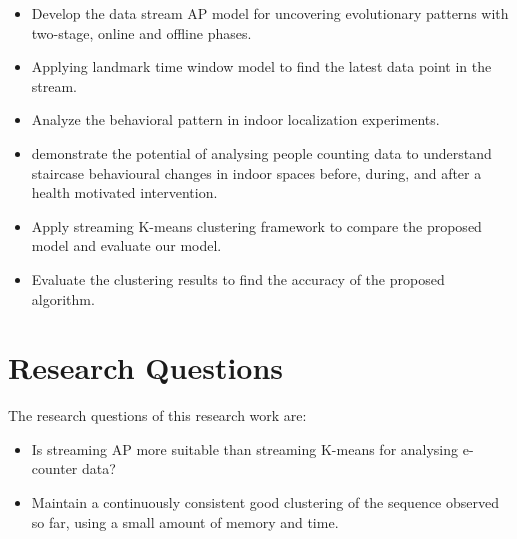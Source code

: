 \documentclass[../UNBThesis2.tex]{subfiles}
\begin{document}
\begin{itemize}
    \item Develop the data stream AP model for uncovering evolutionary patterns with two-stage, online and offline phases.
     \item Applying landmark time window model to find the latest data point in the stream.
   
    \item Analyze the behavioral pattern in indoor localization experiments.
    \item demonstrate the potential of analysing people counting data to understand staircase behavioural changes in indoor spaces before, during, and after a health motivated intervention.
    \item Apply streaming K-means clustering framework to compare the proposed model and evaluate our model.
    \item Evaluate the clustering results to find the accuracy of the proposed algorithm.




\end{itemize}
 

\section{Research Questions}


The research questions of this research work are: 
\begin{itemize}
    \item Is streaming AP more suitable than streaming K-means for analysing e-counter data? 
    \item Maintain a continuously consistent good clustering of the sequence observed so far, using a small amount of memory and time.

\end{itemize}
\end{document}
